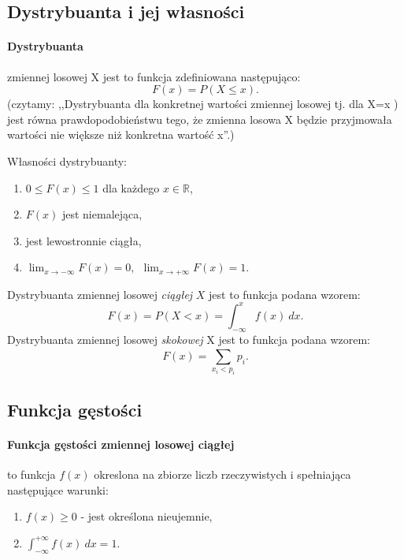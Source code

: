\documentclass[a4paper,twoside]{report}
\begin{document}
\subsection{Dystrybuanta i jej własności}
\paragraph{Dystrybuanta} zmiennej losowej X  jest to funkcja zdefiniowana następująco:
\begin{equation}
F(x) = P(X \le x).
\end{equation}
(czytamy: ,,Dystrybuanta dla konkretnej wartości zmiennej losowej tj. dla X=x ) jest równa prawdopodobieństwu tego, że zmienna losowa X będzie przyjmowała wartości nie większe niż konkretna wartość  x''.)

Własności dystrybuanty:
\begin{enumerate}
\item $0 \le F(x) \le 1$ dla każdego $x \in \mathbb{R}$,
\item $F(x)$ jest niemalejąca,
\item jest lewostronnie ciągła,
\item $\lim_{x \to - \infty} F(x) = 0, ~~\lim_{x \to + \infty} F(x) = 1.$
\end{enumerate}
\medskip
Dystrybuanta zmiennej losowej \emph{ciągłej} $X$ jest to funkcja podana wzorem:
\begin{equation}
F(x) = P(X < x) = \int_{-\infty}^{x} f(x)~dx.
\end{equation}
\medskip
Dystrybuanta zmiennej losowej \emph{skokowej} X jest to funkcja podana wzorem:
\begin{equation}
F(x)=\sum_{x_i < p_i}^{} p_i.
\end{equation}

\subsection{Funkcja gęstości}

\paragraph{Funkcja gęstości zmiennej losowej ciągłej} to funkcja $f(x)$ okreslona na zbiorze liczb rzeczywistych i spełniająca następujące warunki:

\begin{enumerate}
\item $f(x) \ge 0$ - jest określona nieujemnie,
\item $ \int_{-\infty}^{+ \infty} f(x)~dx = 1$.
\end{enumerate}
\end{document}
